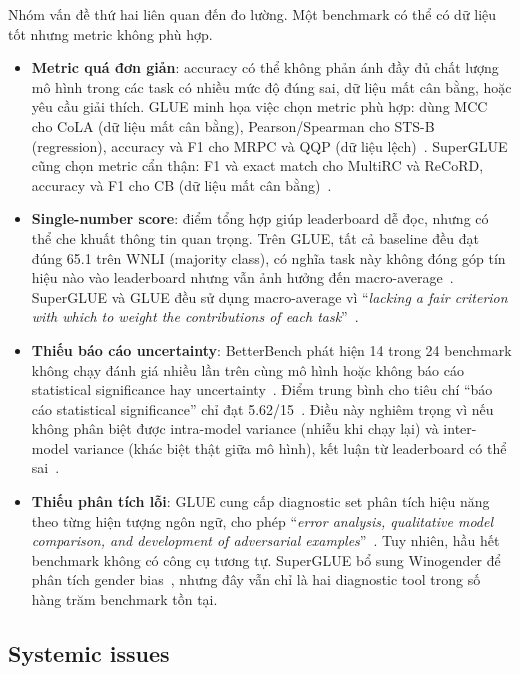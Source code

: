 Nhóm vấn đề thứ hai liên quan đến đo lường. Một benchmark có thể có dữ liệu tốt nhưng metric không phù hợp.

\begin{itemize}
    \item \textbf{Metric quá đơn giản}: accuracy có thể không phản ánh đầy đủ chất lượng mô hình trong các task có nhiều mức độ đúng sai, dữ liệu mất cân bằng, hoặc yêu cầu giải thích. GLUE minh họa việc chọn metric phù hợp: dùng MCC cho CoLA (dữ liệu mất cân bằng), Pearson/Spearman cho STS-B (regression), accuracy và F1 cho MRPC và QQP (dữ liệu lệch)~\cite{glue}. SuperGLUE cũng chọn metric cẩn thận: F1 và exact match cho MultiRC và ReCoRD, accuracy và F1 cho CB (dữ liệu mất cân bằng)~\cite{superglue}.

    \item \textbf{Single-number score}: điểm tổng hợp giúp leaderboard dễ đọc, nhưng có thể che khuất thông tin quan trọng. Trên GLUE, tất cả baseline đều đạt đúng 65.1 trên WNLI (majority class), có nghĩa task này không đóng góp tín hiệu nào vào leaderboard nhưng vẫn ảnh hưởng đến macro-average~\cite{glue}. SuperGLUE và GLUE đều sử dụng macro-average vì ``\textit{lacking a fair criterion with which to weight the contributions of each task}''~\cite{superglue}.

    \item \textbf{Thiếu báo cáo uncertainty}: BetterBench phát hiện 14 trong 24 benchmark không chạy đánh giá nhiều lần trên cùng mô hình hoặc không báo cáo statistical significance hay uncertainty~\cite{betterbench}. Điểm trung bình cho tiêu chí ``báo cáo statistical significance'' chỉ đạt 5.62/15~\cite{betterbench}. Điều này nghiêm trọng vì nếu không phân biệt được intra-model variance (nhiễu khi chạy lại) và inter-model variance (khác biệt thật giữa mô hình), kết luận từ leaderboard có thể sai~\cite{betterbench}.

    \item \textbf{Thiếu phân tích lỗi}: GLUE cung cấp diagnostic set phân tích hiệu năng theo từng hiện tượng ngôn ngữ, cho phép ``\textit{error analysis, qualitative model comparison, and development of adversarial examples}''~\cite{glue}. Tuy nhiên, hầu hết benchmark không có công cụ tương tự. SuperGLUE bổ sung Winogender để phân tích gender bias~\cite{superglue}, nhưng đây vẫn chỉ là hai diagnostic tool trong số hàng trăm benchmark tồn tại.
\end{itemize}

\subsection{Systemic issues}

